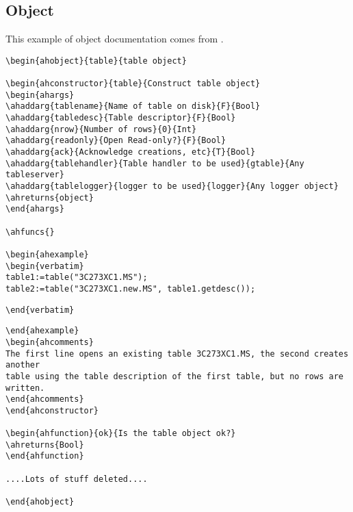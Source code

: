\subsection{Object}

\label{197:example_object}
This example of object documentation comes from
.
\begin{verbatim}
\begin{ahobject}{table}{table object}

\begin{ahconstructor}{table}{Construct table object}
\begin{ahargs}
\ahaddarg{tablename}{Name of table on disk}{F}{Bool}
\ahaddarg{tabledesc}{Table descriptor}{F}{Bool}
\ahaddarg{nrow}{Number of rows}{0}{Int}
\ahaddarg{readonly}{Open Read-only?}{F}{Bool}
\ahaddarg{ack}{Acknowledge creations, etc}{T}{Bool}
\ahaddarg{tablehandler}{Table handler to be used}{gtable}{Any tableserver}
\ahaddarg{tablelogger}{logger to be used}{logger}{Any logger object}
\ahreturns{object}
\end{ahargs}

\ahfuncs{}

\begin{ahexample}
\begin{verbatim}
table1:=table("3C273XC1.MS");
table2:=table("3C273XC1.new.MS", table1.getdesc());
\end{verbatim}
\verb!\end{verbatim}!
\begin{verbatim}
\end{ahexample}
\begin{ahcomments}
The first line opens an existing table 3C273XC1.MS, the second creates another
table using the table description of the first table, but no rows are written.
\end{ahcomments}
\end{ahconstructor}

\begin{ahfunction}{ok}{Is the table object ok?}
\ahreturns{Bool}
\end{ahfunction}

....Lots of stuff deleted....

\end{ahobject}
\end{verbatim}

